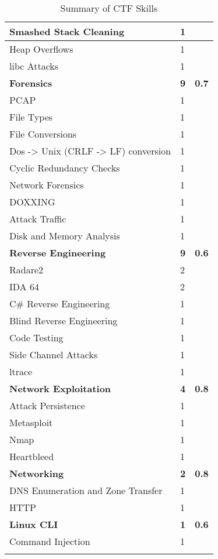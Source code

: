 \documentclass[a4paper,11pt]{report}
\begin{document}
\begin{center}
\begin{longtable}{| l | l | l |}
					\quad Smashed Stack Cleaning & 1 & \\ \hline 
					\quad Heap Overflows & 1 & \\ \hline 
					\quad libc Attacks & 1 & \\ \hline 
					\textbf{Forensics} & \textbf{9} & \textbf{0.7}\\ \hline
					\quad PCAP & 1 & \\ \hline
					\quad File Types & 1 & \\ \hline
					\quad File Conversions & 1 & \\ \hline 
					\quad Dos -> Unix (CRLF -> LF) conversion & 1 & \\ \hline 
					\quad Cyclic Redundancy Checks & 1 & \\ \hline
					\quad Network Forensics & 1 & \\ \hline 
					\quad DOXXING & 1 & \\ \hline 
					\quad Attack Traffic & 1 & \\ \hline 
					\quad Disk and Memory Analysis & 1 & \\ \hline 
					\textbf{Reverse Engineering} & \textbf{9} & \textbf{0.6}\\ \hline 
					\quad Radare2 & 2 & \\ \hline 
					\quad IDA 64 & 2 & \\ \hline 
					\quad C\# Reverse Engineering & 1 & \\ \hline
					\quad Blind Reverse Engineering & 1 & \\ \hline 
					\quad Code Testing & 1 & \\ \hline 
					\quad Side Channel Attacks & 1 & \\ \hline 
					\quad ltrace & 1 & \\ \hline 
					\textbf{Network Exploitation} & \textbf{4} & \textbf{0.8} \\ \hline 
					\quad Attack Persistence & 1 & \\ \hline 
					\quad Metasploit & 1 & \\ \hline 
					\quad Nmap & 1 & \\ \hline 
					\quad Heartbleed & 1 & \\ \hline
					\textbf{Networking} & \textbf{2} & \textbf{0.8}\\ \hline
					\quad DNS Enumeration and Zone Transfer & 1 & \\ \hline 
					\quad HTTP & 1 & \\ \hline 
					\textbf{Linux CLI} & \textbf{1} &\textbf{0.6} \\ \hline
					\quad Command Injection & 1 & \\ \hline 
					\caption{\label{tab:summary}Summary of CTF Skills}
				\end{longtable}
			\end{center}
\appendix
	\label{ch:Appendix}
	\listoftables
\end{document}
